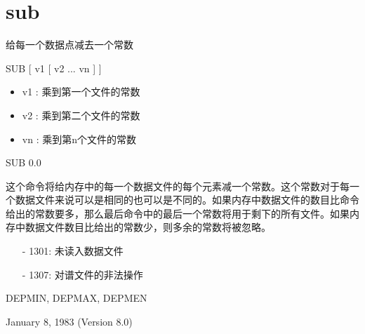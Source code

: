 \section{sub}
\label{cmd:sub}

给每一个数据点减去一个常数

SUB  [ v1 [ v2 ... vn ] ]

\begin{itemize}
\item v1 :  乘到第一个文件的常数 
\item v2 :  乘到第二个文件的常数 
\item vn :  乘到第n个文件的常数 
\end{itemize}

SUB 0.0

这个命令将给内存中的每一个数据文件的每个元素减一个常数。这个常数对于每一个数据文件来说可以是相同的也可以是不同的。如果内存中数据文件的数目比命令给出的常数要多，那么最后命令中的最后一个常数将用于剩下的所有文件。如果内存中数据文件数目比给出的常数少，则多余的常数将被忽略。

\begin{itemize}
\item[-]1301: 未读入数据文件
\item[-]1307: 对谱文件的非法操作
\end{itemize}

DEPMIN, DEPMAX, DEPMEN

January 8, 1983 (Version 8.0)
